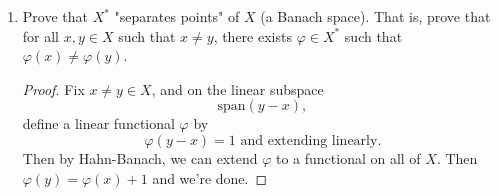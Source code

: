 \documentclass[12pt,letterpaper]{article}
\renewcommand{\phi}{\varphi}
\begin{document}
\begin{enumerate}
\begin{proof}
Thus ${|\psi(Au_n)|}\to B < \infty$ for any $(u_n)$ with every $\norm{u_n}=1$, so we're done. To see this, note that the sequence ${|\psi(Au_n)|}$ is bounded for any $\psi\in Y^*$ and any sequence in the unit ball $(u_n)\subset \closure{B}(X)$, which means $Au_n$ is also bounded. Therefore $\sup\limits_{\norm{u}=1}\norm{Au}<\infty$. 
\end{proof}

\pagebreak
\item Prove that $X^*$ "separates points" of $X$ (a Banach space). That is, prove that for all $x,y\in X$ such that $x\neq y$, there exists $\phi\in X^*$ such that $\phi(x)\neq\phi(y)$. 
\begin{proof}
 Fix $x\neq y\in X$, and on the linear subspace 
$$\text{span}(y-x),$$
define a linear functional $\phi$ by 
$$\phi(y-x)=1 \text{ and extending linearly.}$$
Then by Hahn-Banach, we can extend $\phi$ to a functional on all of $X$. Then $\phi(y)=\phi(x)+1$ and we're done.
\end{proof}


\end{enumerate}
\end{document}
